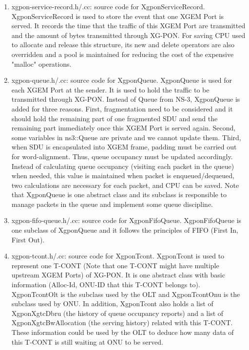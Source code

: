 \begin{enumerate}
 \item xgpon-service-record.h/.cc: source code for {\color{red} XgponServiceRecord}. XgponServiceRecord is used to 
store the event that one XGEM Port is served. It records the time that the traffic of this XGEM Port are transmitted 
and the amount of bytes transmitted through XG-PON. For saving CPU used to allocate and release this structure, 
its new and delete operators are also overridden and a pool is maintained for reducing the cost of the expensive "malloc" operations.

 \item xgpon-queue.h/.cc: source code for {\color{red} XgponQueue}. XgponQueue is used for each XGEM Port at the sender. 
It is used to hold the traffic to be transmitted through XG-PON. Instead of Queue from NS-3, XgponQueue is added for 
three reasons. First, fragmentation need to be considered and it should hold the remaining part of one fragmented 
SDU and send the remaining part immediately once this XGEM Port is served again. Second, some variables in 
ns3::Queue are private and we cannot update them. Third, when SDU is encapsulated into XGEM frame, padding 
must be carried out for word-alignment. Thus, queue occupancy must be updated accordingly. 
Instead of calculating queue occupancy (visiting each packet in the queue) when needed, 
this value is maintained when packet is enqueued/dequeued, two calculations are necessary for each packet, 
and CPU can be saved. Note that XgponQueue is one abstract class and its subclass 
is responsible to manage packets in the queue and implement some queue discipline.

 \item xgpon-fifo-queue.h/.cc: source code for {\color{red} XgponFifoQueue}. XgponFifoQueue is one subclass 
of XgponQueue and it follows the principles of FIFO (First In, First Out).
\vspace{0.1in}


 \item xgpon-tcont.h/.cc: source code for {\color{red} XgponTcont}. XgponTcont is used to represent 
one T-CONT (Note that one T-CONT might have multiple upstream XGEM Ports) of XG-PON. It is one abstract class 
with basic information (Alloc-Id, ONU-ID that this T-CONT belongs to). XgponTcontOlt is the subclass used by 
the OLT and XgponTcontOnu is the subclass used by ONU. In addition, XgponTcont also holds a list of XgponXgtcDbru 
(the history of queue occupancy reports) and a list of XgponXgtcBwAllocation (the serving history) 
related with this T-CONT. These information could be used by the OLT to deduce how many data of this T-CONT 
is still waiting at ONU to be served.


\end{enumerate}
